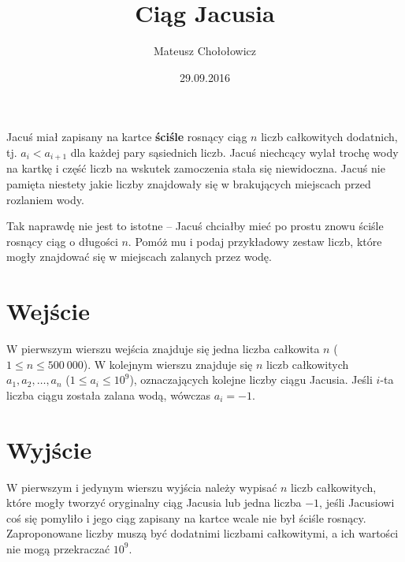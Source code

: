 \documentclass[zad,zawodnik,utf8]{sinol}
\title{Ciąg Jacusia}
\author{Mateusz Chołołowicz} %
\date{29.09.2016}
\begin{document}
  \begin{tasktext}%

Jacuś miał zapisany na kartce \textbf{ściśle} rosnący ciąg $n$ liczb całkowitych dodatnich, tj. $a_i < a_{i + 1}$ dla każdej pary sąsiednich liczb. Jacuś niechcący wylał
trochę wody na kartkę i część liczb na wskutek zamoczenia stała się niewidoczna. Jacuś nie pamięta niestety jakie
liczby znajdowały się w brakujących miejscach przed rozlaniem wody. 

Tak naprawdę nie jest to istotne -- Jacuś chciałby mieć po prostu znowu ściśle rosnący ciąg o długości $n$. Pomóż mu
i podaj przykładowy zestaw liczb, które mogły znajdować się w miejscach zalanych przez wodę.

 \section{Wejście}
    W pierwszym wierszu wejścia znajduje się jedna liczba całkowita $n$ ($1 \leq n \leq 500~000$).
    W kolejnym wierszu znajduje się $n$ liczb całkowitych $a_1, a_2, \dots, a_n$ ($1 \leq a_i \leq 10^9$), oznaczających kolejne liczby ciągu
    Jacusia. Jeśli $i$-ta liczba ciągu została zalana wodą, wówczas $a_i = -1$.
    
 
  \section{Wyjście}
    W pierwszym i jedynym wierszu wyjścia należy wypisać $n$ liczb całkowitych, które mogły tworzyć oryginalny ciąg Jacusia
    lub jedna liczba $-1$, jeśli Jacusiowi coś się pomyliło i jego ciąg zapisany na kartce wcale nie był ściśle rosnący.
    Zaproponowane liczby muszą być dodatnimi liczbami całkowitymi, a ich wartości nie mogą przekraczać $10^9$.
    
    \makecompactexample

  \end{tasktext}
\end{document}
